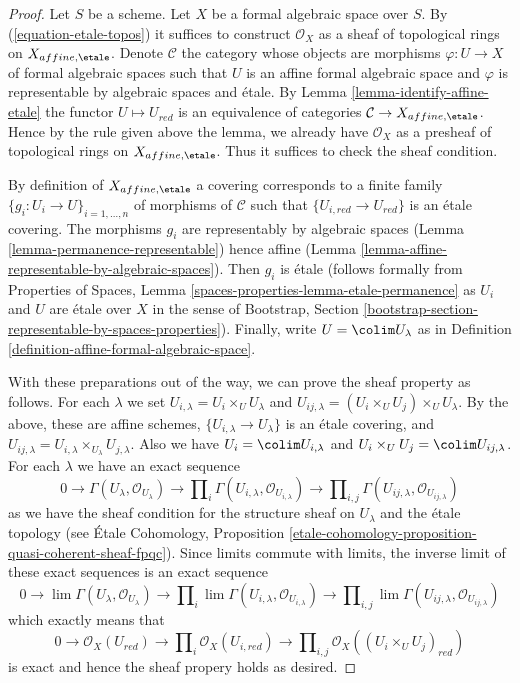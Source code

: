 \begin{proof}
Let $S$ be a scheme. Let $X$ be a formal algebraic space over $S$.
By (\ref{equation-etale-topos}) it suffices to construct $\mathcal{O}_X$
as a sheaf of topological rings on $X_{affine, \etale}$.
Denote $\mathcal{C}$ the category whose objects
are morphisms $\varphi : U \to X$ of formal algebraic spaces such that
$U$ is an affine formal algebraic space and
$\varphi$ is representable by algebraic spaces and \'etale.
By Lemma \ref{lemma-identify-affine-etale}
the functor $U \mapsto U_{red}$ is an equivalence of categories
$\mathcal{C} \to X_{affine, \etale}$. Hence by the rule given
above the lemma, we already have $\mathcal{O}_X$ as a presheaf of
topological rings on $X_{affine, \etale}$. Thus it suffices to check
the sheaf condition.

\medskip\noindent
By definition of $X_{affine, \etale}$ a covering corresponds to a finite
family $\{g_i : U_i \to U\}_{i = 1, \ldots, n}$ of morphisms of $\mathcal{C}$
such that $\{U_{i, red} \to U_{red}\}$ is an \'etale covering.
The morphisms $g_i$ are representably by algebraic spaces
(Lemma \ref{lemma-permanence-representable}) hence affine
(Lemma \ref{lemma-affine-representable-by-algebraic-spaces}).
Then $g_i$ is \'etale (follows formally from
Properties of Spaces, Lemma \ref{spaces-properties-lemma-etale-permanence}
as $U_i$ and $U$ are \'etale over $X$ in the sense of
Bootstrap, Section \ref{bootstrap-section-representable-by-spaces-properties}).
Finally, write $U = \colim U_\lambda$ as in
Definition \ref{definition-affine-formal-algebraic-space}.

\medskip\noindent
With these preparations out of the way, we can prove the sheaf
property as follows. For each $\lambda$ we set
$U_{i, \lambda} = U_i \times_U U_\lambda$ and
$U_{ij, \lambda} = (U_i \times_U U_j) \times_U U_\lambda$.
By the above, these are affine schemes, $\{U_{i, \lambda} \to U_\lambda\}$
is an \'etale covering, and
$U_{ij, \lambda} = U_{i, \lambda} \times_{U_\lambda} U_{j, \lambda}$.
Also we have $U_i = \colim U_{i, \lambda}$ and
$U_i \times_U U_j = \colim U_{ij, \lambda}$.
For each $\lambda$ we have an exact sequence
$$
0 \to
\Gamma(U_\lambda, \mathcal{O}_{U_\lambda}) \to
\prod\nolimits_i \Gamma(U_{i, \lambda}, \mathcal{O}_{U_{i, \lambda}}) \to
\prod\nolimits_{i, j} \Gamma(U_{ij, \lambda}, \mathcal{O}_{U_{ij, \lambda}})
$$
as we have the sheaf condition for the structure sheaf
on $U_\lambda$ and the \'etale topology
(see \'Etale Cohomology, Proposition
\ref{etale-cohomology-proposition-quasi-coherent-sheaf-fpqc}).
Since limits commute with limits, the inverse limit of these
exact sequences is an exact sequence
$$
0 \to
\lim \Gamma(U_\lambda, \mathcal{O}_{U_\lambda}) \to
\prod\nolimits_i \lim \Gamma(U_{i, \lambda}, \mathcal{O}_{U_{i, \lambda}}) \to
\prod\nolimits_{i, j} \lim
\Gamma(U_{ij, \lambda}, \mathcal{O}_{U_{ij, \lambda}})
$$
which exactly means that
$$
0 \to
\mathcal{O}_X(U_{red}) \to
\prod\nolimits_i \mathcal{O}_X(U_{i, red}) \to
\prod\nolimits_{i, j} \mathcal{O}_X((U_i \times_U U_j)_{red})
$$
is exact and hence the sheaf propery holds as desired.
\end{proof}

